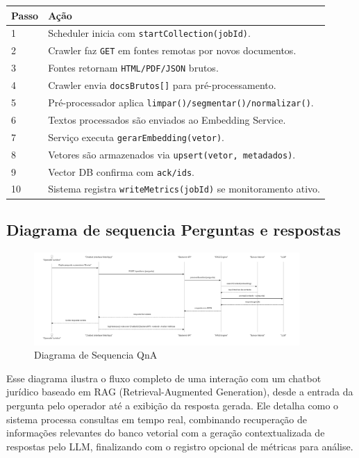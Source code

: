\begin{table}[h]
\centering
\begin{tabular}{|p{2cm}|p{13cm}|}
    \hline
    \textbf{Passo} & \textbf{Ação} \\ \hline
    1 & Scheduler inicia com \texttt{startCollection(jobId)}. \\ \hline
    2 & Crawler faz \texttt{GET} em fontes remotas por novos documentos. \\ \hline
    3 & Fontes retornam \texttt{HTML/PDF/JSON} brutos. \\ \hline
    4 & Crawler envia \texttt{docsBrutos[]} para pré-processamento. \\ \hline
    5 & Pré-processador aplica \texttt{limpar()/segmentar()/normalizar()}. \\ \hline
    6 & Textos processados são enviados ao Embedding Service. \\ \hline
    7 & Serviço executa \texttt{gerarEmbedding(vetor)}. \\ \hline
    8 & Vetores são armazenados via \texttt{upsert(vetor, metadados)}. \\ \hline
    9 & Vector DB confirma com \texttt{ack/ids}. \\ \hline
    10 & Sistema registra \texttt{writeMetrics(jobId)} se monitoramento ativo. \\ \hline
\end{tabular}
\end{table}
    
\subsection{Diagrama de sequencia Perguntas e respostas}
\begin{figure}[H]
  \centering
  \includegraphics[width=0.9\textwidth]{latex-overleaf/04-figuras/sequencia-pergunta.png}
  \caption{Diagrama de Sequencia QnA}
  \label{fig:QnA-Sequencia}
\end{figure}



Esse diagrama ilustra o fluxo completo de uma interação com um chatbot jurídico baseado em RAG (Retrieval-Augmented Generation), desde a entrada da pergunta pelo operador até a exibição da resposta gerada. Ele detalha como o sistema processa consultas em tempo real, combinando recuperação de informações relevantes do banco vetorial com a geração contextualizada de respostas pelo LLM, finalizando com o registro opcional de métricas para análise. 

